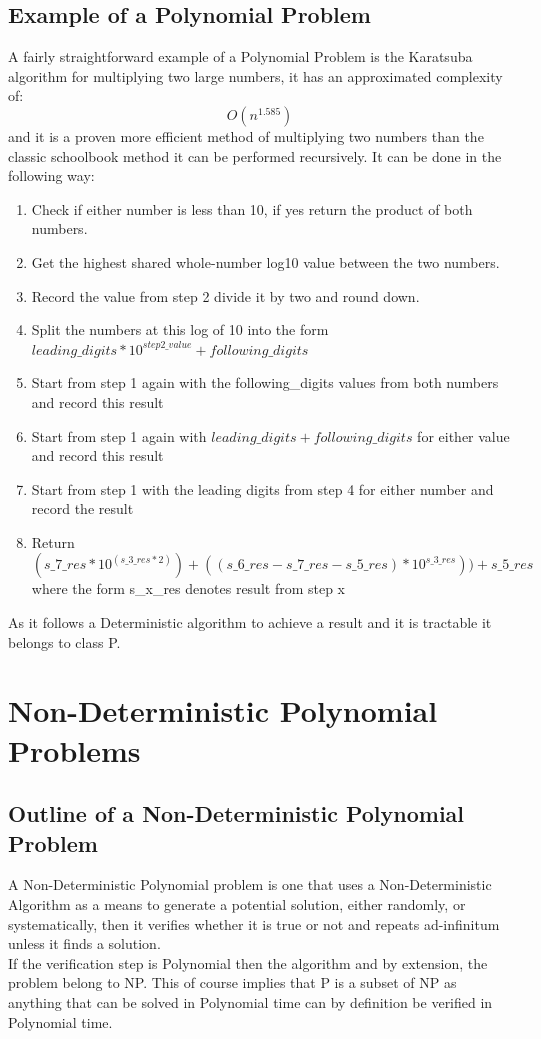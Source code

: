 \documentclass{article}
\begin{document}
	\subsection{Example of a Polynomial Problem}
	A fairly straightforward example of a Polynomial Problem is the Karatsuba algorithm for multiplying two large numbers, it has an approximated complexity of: $$O({n}^{1.585})$$ and it is a proven more efficient method of multiplying two numbers than the classic schoolbook method it can be performed recursively.\citep{weiss_2006} It can be done in the following way:
	\begin{enumerate}
		\item Check if either number is less than 10, if yes return the product of both numbers.
		\item Get the highest shared whole-number log10 value between the two numbers.
		\item Record the value from step 2 divide it by two and round down.
		\item Split the numbers at this log of 10 into the form $leading\_digits * {10}^{step2\_value} + following\_digits$
		\item Start from step 1 again with the following\_digits values from both numbers and record this result
		\item Start from step 1 again with $leading\_digits + following\_digits$ for either value and record this result
		\item Start from step 1 with the leading digits from step 4 for either number and record the result
		\item Return $$(s\_7\_res * {10}^{(s\_3\_res * 2)}) + ((s\_6\_res - s\_7\_res - s\_5\_res) * {10}^{s\_3\_res})) + s\_5\_res$$ where the form s\_x\_res denotes result from step x
	\end{enumerate}
	As it follows a Deterministic algorithm to achieve a result and it is tractable it belongs to class P.
	\section{Non-Deterministic Polynomial Problems}
	\subsection{Outline of a Non-Deterministic Polynomial Problem}
		A Non-Deterministic Polynomial problem is one that uses a Non-Deterministic Algorithm as a means to generate a potential solution, either randomly, or systematically, then it verifies whether it is true or not and repeats ad-infinitum unless it finds a solution.\\
		If the verification step is Polynomial then the algorithm and by extension, the problem belong to NP. This of course implies that P is a subset of NP as anything that can be solved in Polynomial time can by definition be verified in Polynomial time.
\end{document}
